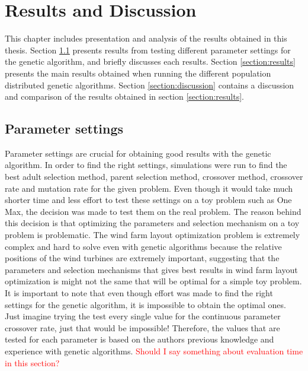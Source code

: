 \chapter{Results and Discussion}\label{chapter:results}
This chapter includes presentation and analysis of the results obtained in this thesis. Section \ref{section:parameter settings} presents results from testing different parameter settings for the genetic algorithm, and briefly discusses each results. Section \ref{section:results} presents the main results obtained when running the different population distributed genetic algorithms. Section \ref{section:discussion} contains a discussion and comparison of the results obtained in section \ref{section:results}.


\section{Parameter settings}\label{section:parameter settings}
Parameter settings are crucial for obtaining good results with the genetic algorithm. In order to find the right settings, simulations were run to find the best adult selection method, parent selection method, crossover method, crossover rate and mutation rate for the given problem. Even though it would take much shorter time and less effort to test these settings on a toy problem such as One Max, the decision was made to test them on the real problem. The reason behind this decision is that optimizing the parameters and selection mechanism on a toy problem is problematic. The wind farm layout optimization problem is extremely complex and hard to solve even with genetic algorithms because the relative positions of the wind turbines are extremely important, suggesting that the parameters and selection mechanisms that gives best results in wind farm layout optimization is might not the same that will be optimal for a simple toy problem. It is important to note that even though effort was made to find the right settings for the genetic algorithm,  it is impossible to obtain the optimal ones. Just imagine trying the test every single value for the continuous parameter crossover rate, just that would be impossible! Therefore, the values that are tested for each parameter is based on the authors previous knowledge and experience with genetic algorithms. \textcolor{red}{Should I say something about evaluation time in this section?}\\

